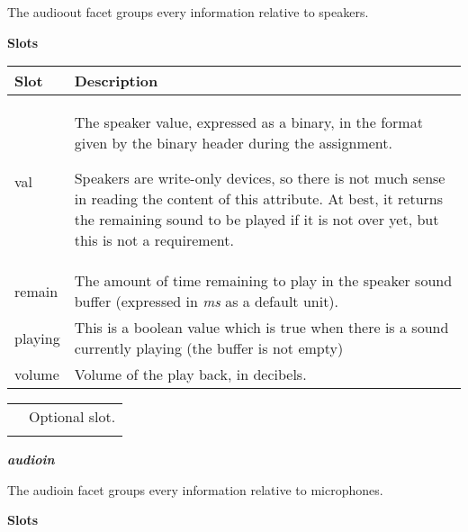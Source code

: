 \documentclass[a4paper]{article}
\begin{document}
{\sffamily
The audioout facet groups every information relative to speakers. }

{\sffamily\bfseries
Slots}

\begin{flushleft}
\tablehead{}
\begin{supertabular}{|m{3.293cm}|m{11.997cm}|}
\hline
\sffamily\bfseries Slot &
\sffamily\bfseries Description\\\hline
val &
{\sffamily The speaker value, expressed as a
binary, in the format given by the binary header during the
assignment.}

\sffamily Speakers are write-only devices, so
there is not much sense in reading the content of this attribute. At
best, it returns the remaining sound to be played if it is not over
yet, but this is not a requirement.\\\hline
remain &
\textsf{The amount of time remaining to play in
the speaker sound buffer (expressed in }\textsf{\textit{ms}}\textsf{ as
a default unit).}\\\hline
playing &
\sffamily This is a boolean value which is true
when there is a sound currently playing (the buffer is not
empty)\\\hline
volume &
\sffamily Volume of the play back, in
decibels.\\\hline
\end{supertabular}
\end{flushleft}
\begin{flushleft}
\tablehead{}
\begin{supertabular}{|m{1.717cm}|m{10.464cm}}
\hhline{-~}
 &
Optional slot.\\\hhline{-~}
\end{supertabular}
\end{flushleft}
{\sffamily\bfseries\itshape
audioin}

{\sffamily
The audioin facet groups every information relative to microphones. }

{\sffamily\bfseries
Slots}
\end{document}

